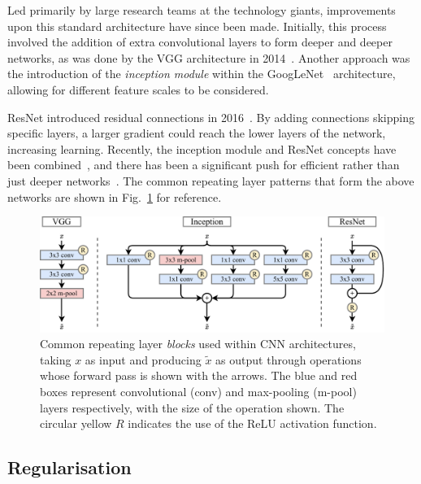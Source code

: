 Led primarily by large research teams at the technology giants, improvements upon this standard
architecture have since been made. Initially, this process involved the addition of extra
convolutional layers to form deeper and deeper networks, as was done by the VGG architecture in
2014~\cite{simonyan2014}. Another approach was the introduction of the \emph{inception module}
within the GoogLeNet~\cite{szegedy2015} architecture, allowing for different feature scales to be
considered.

ResNet introduced residual connections in 2016~\cite{he2016_original, he2016_improved}. By adding
connections skipping specific layers, a larger gradient could reach the lower layers of the
network, increasing learning. Recently, the inception module and ResNet concepts have been
combined~\cite{szegedy2016}, and there has been a significant push for efficient rather than just
deeper networks~\cite{sandler2018, tan2019}. The common repeating layer patterns that form the
above networks are shown in Fig.~\ref{fig:blocks} for reference.

\begin{figure} %
    \includegraphics[width=\textwidth]{diagrams/6-cnn/blocks.pdf}
    \caption[Common Convolutional Neural Network architecture blocks]
    {Common repeating layer \emph{blocks} used within CNN architectures, taking $x$ as input and
        producing $\tilde{x}$ as output through operations whose forward pass is shown with the
        arrows. The blue and red boxes represent convolutional (conv) and max-pooling (m-pool)
        layers respectively, with the size of the operation shown. The circular yellow $R$
        indicates the use of the ReLU activation function.}
    \label{fig:blocks}
\end{figure}

\subsection{Regularisation} %
\label{sec:cnn_theory_reg} %


